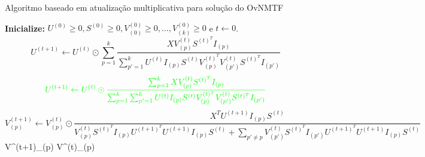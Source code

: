 \documentclass[
    12pt,                %
    oneside,            %
    a4paper,            %
    english,            %
    brazil                %
    ]{abntex2ppgsi}
\begin{document}


\begin{algorithm}[H]
\caption{Algoritmo baseado em atualização multiplicativa para solução do OvNMTF}
\label{algo:ovnmtf}
    \begin{algorithmic}[1]
            \State \textbf{Inicialize:} $U^{(0)} \geq 0, S^{(0)} \geq 0, V_{(0)}^{(0)} \geq 0, \dots, V_{(k)}^{(0)} \geq 0$ e $t \gets 0$.
                \State
                    \begin{equation}
                    \label{eq:ovnmtf:updateU}
                        U^{(t+1)} \gets U^{(t)} \odot \sum_{p=1}^{k} \frac{ X V^{(t)}_{(p)} S^{(t)^T} I_{(p)} }{ \sum_{p'=1}^k U^{(t)} I_{(p)} S^{(t)} V^{(t)^T}_{(p)} V^{(t)}_{(p')} S^{(t)^T} I_{(p')} }
                    \end{equation}
                    \begin{equation}
                    \label{eq:ovnmtf:updateU}
                        \textcolor{green}{U^{(t+1)} \gets U^{(t)} \odot  \frac{ \sum_{p=1}^{k} X V^{(t)}_{(p)} S^{(t)^T} I_{(p)} }{ \sum_{p=1}^{k}\sum_{p'=1}^k U^{(t)} I_{(p)} S^{(t)} V^{(t)^T}_{(p)} V^{(t)}_{(p')} S^{(t)^T} I_{(p')} }}
                    \end{equation}
                    \State
                        \begin{equation}
                        \label{eq:ovnmtf:updateV}
                            V^{(t+1)}_{(p)} \gets V^{(t)}_{(p)} \odot \frac{ X^T U^{(t+1)} I_{(p)} S^{(t)} }{ V^{(t)}_{(p)} S^{(t)^T} I_{(p)} U^{(t+1)^T} U^{(t+1)} I_{(p)} S^{(t)} + \sum_{p' \neq p} V^{(t)}_{(p')} S^{(t)^T} I_{(p')} U^{(t+1)^T} U^{(t+1)} I_{(p)} S^{(t)} }
                        \end{equation}
                        \label{eq:ovnmtf:updateV}
                            V^{(t+1)}_{(p)} \gets V^{(t)}_{(p)} \odot {}

\end{algorithmic}
\end{algorithm}
\end{document}
